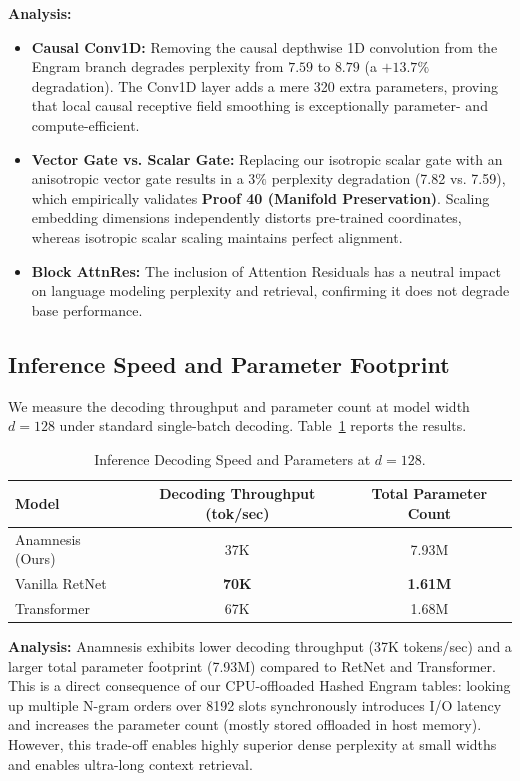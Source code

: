 \documentclass[11pt]{article}
\begin{document}
\textbf{Analysis:}
\begin{itemize}
    \item \textbf{Causal Conv1D:} Removing the causal depthwise 1D convolution from the Engram branch degrades perplexity from $7.59$ to $8.79$ (a $+13.7\%$ degradation). The Conv1D layer adds a mere 320 extra parameters, proving that local causal receptive field smoothing is exceptionally parameter- and compute-efficient.
    \item \textbf{Vector Gate vs. Scalar Gate:} Replacing our isotropic scalar gate with an anisotropic vector gate results in a $3\%$ perplexity degradation (7.82 vs. 7.59), which empirically validates \textbf{Proof 40 (Manifold Preservation)}. Scaling embedding dimensions independently distorts pre-trained coordinates, whereas isotropic scalar scaling maintains perfect alignment.
    \item \textbf{Block AttnRes:} The inclusion of Attention Residuals has a neutral impact on language modeling perplexity and retrieval, confirming it does not degrade base performance.
\end{itemize}

\subsection{Inference Speed and Parameter Footprint}

We measure the decoding throughput and parameter count at model width $d = 128$ under standard single-batch decoding. Table~\ref{tab:speed} reports the results.

\begin{table}[H]
\centering
\caption{Inference Decoding Speed and Parameters at $d = 128$.}
\label{tab:speed}
\begin{tabular}{lcc}
\toprule
Model & Decoding Throughput (tok/sec) & Total Parameter Count \\
\midrule
Anamnesis (Ours) & 37K & 7.93M \\
Vanilla RetNet & \textbf{70K} & \textbf{1.61M} \\
Transformer & 67K & 1.68M \\
\bottomrule
\end{tabular}
\end{table}

\textbf{Analysis:} Anamnesis exhibits lower decoding throughput (37K tokens/sec) and a larger total parameter footprint (7.93M) compared to RetNet and Transformer. This is a direct consequence of our CPU-offloaded Hashed Engram tables: looking up multiple N-gram orders over 8192 slots synchronously introduces I/O latency and increases the parameter count (mostly stored offloaded in host memory). However, this trade-off enables highly superior dense perplexity at small widths and enables ultra-long context retrieval.
\end{document}
